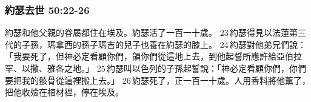 \subsubsection{約瑟去世 50:22-26}
約瑟和他父親的眷屬都住在埃及。約瑟活了一百一十歲。 23 約瑟得見以法蓮第三代的子孫，瑪拿西的孫子瑪吉的兒子也養在約瑟的膝上。 24 約瑟對他弟兄們說：「我要死了，但神必定看顧你們，領你們從這地上去，到他起誓所應許給亞伯拉罕、以撒、雅各之地。」 25 約瑟叫以色列的子孫起誓說：「神必定看顧你們，你們要把我的骸骨從這裡搬上去。」 26 約瑟死了，正一百一十歲。人用香料將他薰了，把他收殮在棺材裡，停在埃及。




